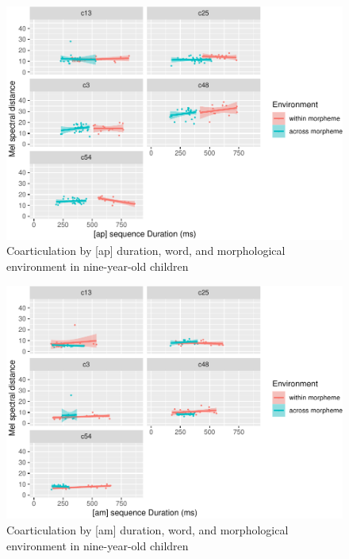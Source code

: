 \documentclass[a4paper,man,floatsintext,natbib,donotrepeattitle, apacite]{apa6}
\begin{document}
\begin{figure}
\centering
\includegraphics{3_ch3_results_files/figure-latex/nine-facet-ap-1.pdf}
\caption{\label{fig:nine-facet-ap}Coarticulation by {[}ap{]} duration, word, and morphological environment in nine-year-old children}
\end{figure}

\begin{figure}
\centering
\includegraphics{3_ch3_results_files/figure-latex/nine-facet-am-1.pdf}
\caption{\label{fig:nine-facet-am}Coarticulation by {[}am{]} duration, word, and morphological environment in nine-year-old children}
\end{figure}
\end{document}
